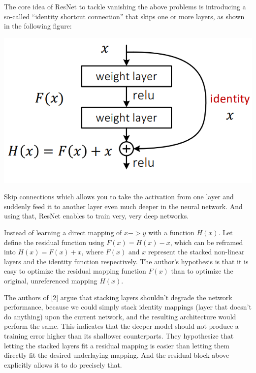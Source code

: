 \par The core idea of ResNet to tackle vanishing the above problems is introducing a so-called “identity shortcut connection” that skips one or more layers, as shown in the following figure:
\begin{center}
\includegraphics[width=\textwidth]{skip_connection.png}
\end{center}
Skip connections which allows you to take the activation from one layer and suddenly feed it to another layer even much deeper in the neural network. And using that, ResNet enables to train very, very deep networks. \par
Instead of learning a direct mapping of $x->y$ with a function $H(x)$. Let define the residual function using $F(x) = H(x) - x$, which can be reframed into $H(x) = F(x)+x$, where $F(x)$ and $x$ represent the stacked non-linear layers and the identity function respectively. The author's hypothesis is that it is easy to optimize the residual mapping function $F(x)$ than to optimize the original, unreferenced mapping $H(x)$.
\pagebreak
\par The authors of [2] argue that stacking layers shouldn’t degrade the network performance, because we could simply stack identity mappings (layer that doesn’t do anything) upon the current network, and the resulting architecture would perform the same. This indicates that the deeper model should not produce a training error higher than its shallower counterparts. They hypothesize that letting the stacked layers fit a residual mapping is easier than letting them directly fit the desired underlaying mapping. And the residual block above explicitly allows it to do precisely that.
